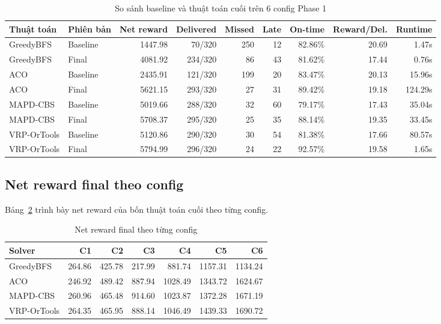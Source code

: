 \documentclass[conference]{IEEEtran}
\begin{document}
\begin{table}[t]
\centering
\caption{So sánh baseline và thuật toán cuối trên 6 config Phase 1}
\label{tab:baseline-final}
\begin{tabular}{llrrrrrrr}
\toprule
Thuật toán & Phiên bản & Net reward & Delivered & Missed & Late & On-time & Reward/Del. & Runtime \\
\midrule
GreedyBFS & Baseline & 1447.98 & 70/320 & 250 & 12 & 82.86\% & 20.69 & 1.47s \\
GreedyBFS & Final & 4081.92 & 234/320 & 86 & 43 & 81.62\% & 17.44 & 0.76s \\
ACO & Baseline & 2435.91 & 121/320 & 199 & 20 & 83.47\% & 20.13 & 15.96s \\
ACO & Final & 5621.15 & 293/320 & 27 & 31 & 89.42\% & 19.18 & 124.29s \\
MAPD-CBS & Baseline & 5019.66 & 288/320 & 32 & 60 & 79.17\% & 17.43 & 35.04s \\
MAPD-CBS & Final & 5708.37 & 295/320 & 25 & 35 & 88.14\% & 19.35 & 33.45s \\
VRP-OrTools & Baseline & 5120.86 & 290/320 & 30 & 54 & 81.38\% & 17.66 & 80.57s \\
VRP-OrTools & Final & 5794.99 & 296/320 & 24 & 22 & 92.57\% & 19.58 & 1.65s \\
\bottomrule
\end{tabular}
\end{table}

\subsection{Net reward final theo config}
Bảng~\ref{tab:reward-config} trình bày net reward của bốn thuật toán cuối theo từng config.

\begin{table}[t]
\centering
\caption{Net reward final theo từng config}
\label{tab:reward-config}
\begin{tabular}{lrrrrrr}
\toprule
Solver & C1 & C2 & C3 & C4 & C5 & C6 \\
\midrule
GreedyBFS & 264.86 & 425.78 & 217.99 & 881.74 & 1157.31 & 1134.24 \\
ACO & 246.92 & 489.42 & 887.94 & 1028.49 & 1343.72 & 1624.67 \\
MAPD-CBS & 260.96 & 465.48 & 914.60 & 1023.87 & 1372.28 & 1671.19 \\
VRP-OrTools & 264.35 & 465.95 & 888.14 & 1046.49 & 1439.33 & 1690.72 \\
\bottomrule
\end{tabular}
\end{table}
\end{document}
